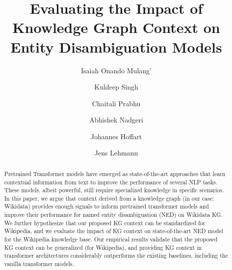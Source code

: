 \documentclass[sigconf, superscriptaddress]{acmart}
\begin{document}
\fancyhead{}

\title{Evaluating the Impact of Knowledge Graph Context on Entity Disambiguation Models}



\author{Isaiah Onando Mulang'}

\author{Kuldeep Singh}

\author{Chaitali Prabhu}

\author{Abhishek Nadgeri}

\author{Johannes Hoffart}
  \author{Jens Lehmann}



\renewcommand{\shortauthors}{Mulang', IO. et al.}



















\begin{abstract}
Pretrained Transformer models have emerged as state-of-the-art approaches that learn contextual information from text to improve the performance of several NLP tasks. These models, albeit powerful, still require specialized knowledge in specific scenarios. In this paper, we argue that context derived from a knowledge graph (in our case: Wikidata) provides enough signals to inform pretrained transformer models and improve their performance for named entity disambiguation (NED) on Wikidata KG. We further hypothesize that our proposed KG context can be standardized for Wikipedia, and we evaluate the impact of KG context on state-of-the-art NED model for the Wikipedia knowledge base. Our empirical results validate that the proposed KG context can be generalized (for Wikipedia), and providing KG context in transformer architectures considerably outperforms the existing baselines, including the vanilla transformer models.
\end{abstract}
\end{document}
